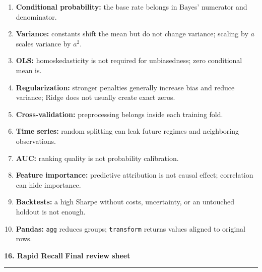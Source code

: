 \documentclass[10pt,a4paper]{article}
\newcommand{\sectionbanner}[2]{%
  \vspace{2mm}
  {\color{navy}\Large\bfseries #1}\hfill
  {\color{blue}\bfseries #2}
  \par\vspace{1mm}\color{line}\rule{\linewidth}{0.8pt}\color{ink}\vspace{2mm}
}
\newcommand{\code}[1]{\texttt{#1}}
\begin{document}
\begin{enumerate}
  \item \textbf{Conditional probability:} the base rate belongs in Bayes' numerator and denominator.
  \item \textbf{Variance:} constants shift the mean but do not change variance; scaling by $a$ scales variance by $a^2$.
  \item \textbf{OLS:} homoskedasticity is not required for unbiasedness; zero conditional mean is.
  \item \textbf{Regularization:} stronger penalties generally increase bias and reduce variance; Ridge does not usually create exact zeros.
  \item \textbf{Cross-validation:} preprocessing belongs inside each training fold.
  \item \textbf{Time series:} random splitting can leak future regimes and neighboring observations.
  \item \textbf{AUC:} ranking quality is not probability calibration.
  \item \textbf{Feature importance:} predictive attribution is not causal effect; correlation can hide importance.
  \item \textbf{Backtests:} a high Sharpe without costs, uncertainty, or an untouched holdout is not enough.
  \item \textbf{Pandas:} \code{agg} reduces groups; \code{transform} returns values aligned to original rows.
\end{enumerate}

\sectionbanner{16. Rapid Recall}{Final review sheet}
\end{document}
